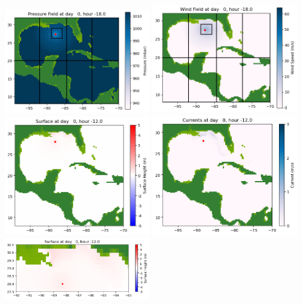 \documentclass[11pt]{article}
\begin{document}
\includegraphics[width=0.475\textwidth]{frame0005fig1006.png}
\vskip 10pt 
\includegraphics[width=0.475\textwidth]{frame0005fig1007.png}
\vskip 10pt 
\includegraphics[width=0.475\textwidth]{frame0006fig1001.png}
\includegraphics[width=0.475\textwidth]{frame0006fig1002.png}
\vskip 10pt 
\includegraphics[width=0.475\textwidth]{frame0006fig1003.png}
\end{document}
